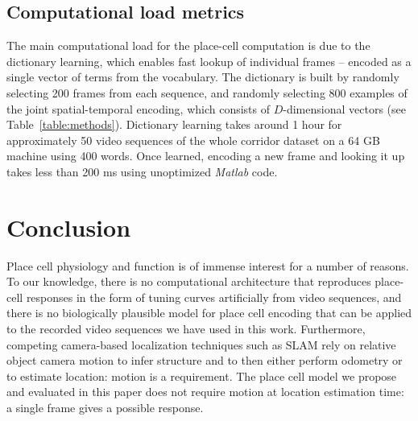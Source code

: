 %	
%
%		

\subsection{Computational load metrics}
The main computational load for the place-cell computation is due to the dictionary learning, which enables fast lookup of individual frames -- encoded as a single vector of terms from the vocabulary.  The dictionary is built by randomly selecting 200 frames from each sequence, and randomly selecting 800 examples of the joint spatial-temporal encoding, which consists of $D$-dimensional vectors (see Table~\ref{table:methods}). Dictionary learning takes around 1 hour for approximately 50 video sequences of the whole corridor dataset on a 64 GB machine using 400 words. Once learned, encoding a new frame and looking it up takes less than 200 ms using unoptimized {\it Matlab} code. 



\section{Conclusion}

Place cell physiology and function is of immense interest for a number of reasons. To our knowledge, there is no computational architecture that reproduces place-cell responses in the form of tuning curves artificially from video sequences, and there is no biologically plausible model for place cell encoding that can be applied to the recorded video sequences we have used in this work.  Furthermore, competing camera-based localization techniques such as SLAM rely on relative object camera motion to infer structure and to then either perform odometry or to estimate location: motion is a requirement.  The place cell model we propose and evaluated in this paper does not require motion at location estimation time: a single frame gives a possible response.

